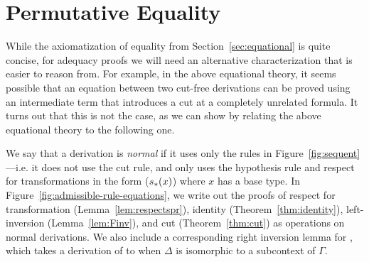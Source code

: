 \section{Permutative Equality}
\label{sec:equational-permutative}

While the axiomatization of equality from Section~\ref{sec:equational}
is quite concise, for adequacy proofs we will need an alternative
characterization that is easier to reason from.  For example, in the
above equational theory, it seems possible that an equation between two
cut-free derivations can be proved using an intermediate term that
introduces a cut at a completely unrelated formula.  It turns out that
this is not the case, as we can show by relating the above equational
theory to the following one.

We say that a derivation is \emph{normal} if it uses only the rules 
in Figure~\ref{fig:sequent}---i.e. it does not use the cut
rule, and only uses the hypothesis rule and respect for
transformations in the form ($s_*(x)$) where $x$ has a base type.
In Figure~\ref{fig:admissible-rule-equations}, we write out the
proofs of respect for transformation (Lemma~\ref{lem:respectspr}), 
identity (Theorem~\ref{thm:identity}), 
left-inversion (Lemma~\ref{lem:Finv}), and
cut (Theorem~\ref{thm:cut}) as operations on normal derivations.  
We also include a corresponding right inversion lemma for \Usymb, which takes a
derivation of 
to 
when $\Delta$ is isomorphic to a subcontext of $\Gamma$.


